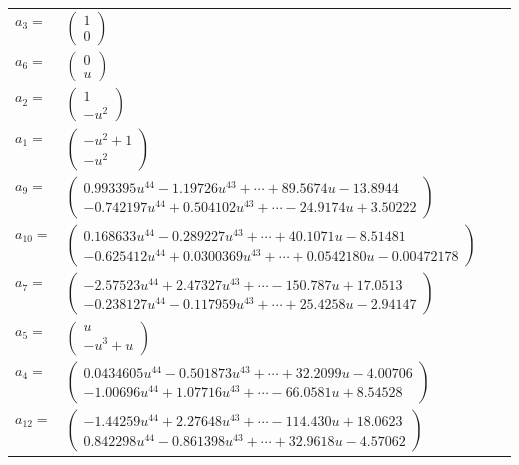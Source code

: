 \documentclass[1p]{elsarticle_modified}
\theoremstyle{definition}
\begin{document}
\begin{tabular}{m{7pt} m{180pt} m{7pt} m{180pt} }
\flushright $a_{3}=$&$\begin{pmatrix}1\\0\end{pmatrix}$ \\
\flushright $a_{6}=$&$\begin{pmatrix}0\\u\end{pmatrix}$ \\
\flushright $a_{2}=$&$\begin{pmatrix}1\\- u^2\end{pmatrix}$ \\
\flushright $a_{1}=$&$\begin{pmatrix}- u^2+1\\- u^2\end{pmatrix}$ \\
\flushright $a_{9}=$&$\begin{pmatrix}0.993395 u^{44}-1.19726 u^{43}+\cdots+89.5674 u-13.8944\\-0.742197 u^{44}+0.504102 u^{43}+\cdots-24.9174 u+3.50222\end{pmatrix}$ \\
\flushright $a_{10}=$&$\begin{pmatrix}0.168633 u^{44}-0.289227 u^{43}+\cdots+40.1071 u-8.51481\\-0.625412 u^{44}+0.0300369 u^{43}+\cdots+0.0542180 u-0.00472178\end{pmatrix}$ \\
\flushright $a_{7}=$&$\begin{pmatrix}-2.57523 u^{44}+2.47327 u^{43}+\cdots-150.787 u+17.0513\\-0.238127 u^{44}-0.117959 u^{43}+\cdots+25.4258 u-2.94147\end{pmatrix}$ \\
\flushright $a_{5}=$&$\begin{pmatrix}u\\- u^3+u\end{pmatrix}$ \\
\flushright $a_{4}=$&$\begin{pmatrix}0.0434605 u^{44}-0.501873 u^{43}+\cdots+32.2099 u-4.00706\\-1.00696 u^{44}+1.07716 u^{43}+\cdots-66.0581 u+8.54528\end{pmatrix}$ \\
\flushright $a_{12}=$&$\begin{pmatrix}-1.44259 u^{44}+2.27648 u^{43}+\cdots-114.430 u+18.0623\\0.842298 u^{44}-0.861398 u^{43}+\cdots+32.9618 u-4.57062\end{pmatrix}$ \\

\end{tabular}
\end{document}

